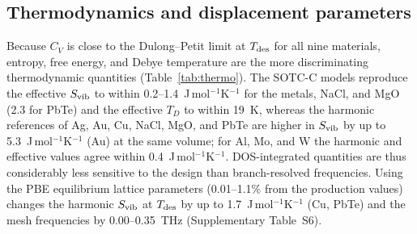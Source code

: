\documentclass[aip,jap,reprint,amsmath,amssymb,floatfix]{revtex4-2}
\begin{document}




\subsection{Thermodynamics and displacement parameters}

Because $C_V$ is close to the Dulong--Petit limit at $T_{\rm des}$ for all
nine materials, entropy, free energy, and Debye temperature are the more
discriminating thermodynamic quantities (Table~\ref{tab:thermo}). The
SOTC-C models reproduce the effective $S_{\rm vib}$ to within
0.2--1.4~J\,mol$^{-1}$K$^{-1}$ for the metals, NaCl, and MgO (2.3 for PbTe)
and the effective $T_D$ to within 19~K, whereas the harmonic references of
Ag, Au, Cu, NaCl, MgO, and PbTe are higher in $S_{\rm vib}$ by up to
5.3~J\,mol$^{-1}$K$^{-1}$ (Au) at the same volume; for Al, Mo, and W the
harmonic and effective values agree within 0.4~J\,mol$^{-1}$K$^{-1}$.
DOS-integrated quantities are thus considerably less sensitive to the design
than branch-resolved frequencies. Using the PBE equilibrium lattice
parameters (0.01--1.1\% from the production values) changes the harmonic
$S_{\rm vib}$ at $T_{\rm des}$ by up to 1.7~J\,mol$^{-1}$K$^{-1}$ (Cu, PbTe) and the
mesh frequencies by 0.00--0.35~THz (Supplementary Table~S6).
\end{document}
